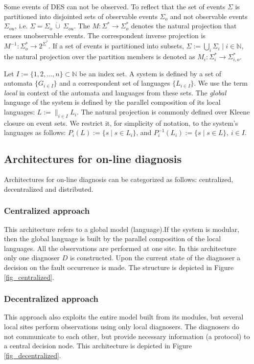 \documentclass[letterpaper, 10pt, conference]{ieeeconf}
\begin{document}
Some events of DES can not be observed. To reflect that the set of events
$\Sigma$ is partitioned into disjointed sets of observable events $\Sigma_o$ and
not observable events $\Sigma_{ou}$, i.e. $\Sigma = \Sigma_o~\dot{\cup}~
\Sigma_{ou}$.
The $M: \Sigma^* \rightarrow \Sigma_o^*$ denotes the natural projection that
erases unobservable events.
The correspondent inverse projection is $M^{-1}: \Sigma_o^* \rightarrow
2^{\Sigma^*}$.
If a set of events is partitioned into subsets, $\Sigma := \bigcup_i
\Sigma_{i} \mid i \in \mathbb{N}$, the natural projection over the partition
members is denoted as $M_i: \Sigma_i^* \rightarrow \Sigma_{i,o}^*$.

Let $I := \{1,2,\ldots,n\} \subset  \mathbb{N}$ be an index set. A system is
defined by a set of automata $\{G_{i \in I}\}$ and a correspondent set of
languages $\{L_{i \in I}\}$. We use the term \emph{local} in context of the
automata and languages from these sets. The \emph{global} language of the system
is defined by the parallel composition \cite{cassandras_introduction_2010} of
its local languages:
$L := \parallel_{i \in I} L_i$.
The natural projection is commonly defined over Kleene closure on event sets.
We restrict it, for simplicity of notation, to the system's languages as
follows: $P_i(L) := \{s\mid s\in L_{i}\}$, and $P_i^{-1}(L_{i}) := \{s \mid s
\in L\}, ~i \in I$.


\subsection{Architectures for on-line diagnosis}
Architectures for on-line diagnosis can be categorized as follows:
centralized, decentralized and distributed.

\subsubsection{Centralized approach}
This architecture refers to a global model (language).If the system is modular,
then the global language is built by the parallel composition of the local
languages. All the observations are performed at one site. In this architecture
only one diagnoser $D$ \cite{sampath_diagnosability_1995} is constructed. Upon
the current state of the diagnoser a decision on the fault occurrence is made.
The structure is depicted in Figure \ref{fig_centralized}.

\subsubsection{Decentralized approach}
This approach also exploits the entire model built from its modules, but several
local sites perform observations using only local diagnosers.
The diagnosers do not communicate to each other, but provide necessary
information (a protocol) to a central decision node. This architecture is
depicted in Figure \ref{fig_decentralized}.
\end{document}
